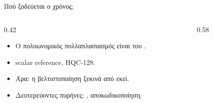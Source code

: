 \begin{frame}{Πού ξοδεύεται ο χρόνος;}
  \begin{columns}[T]
    \begin{column}{0.42\textwidth}
      \begin{itemize}
        \item Ο πολυωνυμικός πολλαπλασιασμός είναι  του \instret.
        \item scalar reference, HQC-128.
        \item Άρα: η βελτιστοποίηση ξεκινά από εκεί.
        \item Δευτερεύοντες πυρήνες: , αποκωδικοποίηση.
      \end{itemize}
    \end{column}
    \begin{column}{0.58\textwidth}
      \resizebox{\linewidth}{!}{}
    \end{column}
  \end{columns}
\end{frame}
